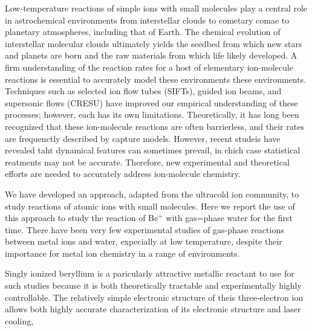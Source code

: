 Low-temperature reactions of simple ions with small molecules play a central role in astrochemical environments from interstellar clouds to cometary comae to planetary atmospheres, including that of Earth. The chemical evolution of interstellar molecular clouds ultimately yields the seedbed from which new stars and planets are born and the raw materials from which life likely developed. A firm understanding of the reaction rates for a host of elementary ion-molecule reactions is essential to accurately model these environments these environments. Techniques such as selected ion flow tubes (SIFTs), guided ion beams, and supersonic flows (CRESU) have improved our empirical understanding of these processes; however, each has its own limitations. Theoretically, it has long been recognized that these ion-molecule reactions are often barrierless, and their rates are frequenctly described by capture models. However, recent studeis have revealed taht dynamical features can sometimes prevail, in chich case statistical reatments may not be accurate. Therefore, new experimental and theoretical efforts are needed to accurately address ion-molecule chemistry.

We have developed an approach, adapted from the ultracold ion community, to study reactions of atomic ions with small molecules. Here we report the use of this approach to study the reaction of Be$^+$ with gas=phase water for the first time. There have been very few experimental studies of gas-phase reactions between metal ions and water, expecially at low temperature, despite their importance for metal ion chemistry in a range of environments.

Singly ionized beryllium is a paricularly attractive metallic reactant to use for such studies because it is both theoretically tractable and experimentally highly controllable. The relatively simple electronic structure of theis three-electron ion allows both highly accurate characterization of its electronic structure and laser cooling,